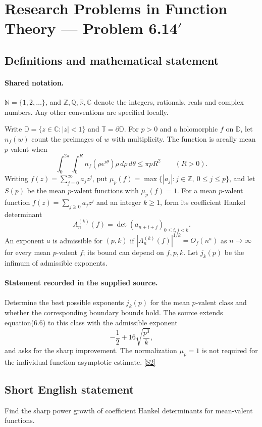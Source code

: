 \documentclass[11pt]{article}
\newcommand{\sref}[2]{\hyperlink{source:#1:#2}{[S#2]}}
\begin{document}
\section{Research Problems in Function Theory — Problem 6.14$\prime$}\label{statement}

\subsection{Definitions and mathematical statement}

\paragraph{Shared notation.}$\mathbb N=\{1,2,\ldots\}$, and $\mathbb Z,\mathbb Q,\mathbb R,\mathbb C$ denote the integers, rationals, reals and complex numbers. Any other conventions are specified locally.


Write $\mathbb D=\{z\in\mathbb C:|z|<1\}$ and $\mathbb T=\partial\mathbb D$. For $p>0$ and a holomorphic $f$ on $\mathbb D$, let $n_f(w)$ count the preimages of $w$ with multiplicity. The function is areally mean $p$-valent when
\[\int_0^{2\pi}\int_0^R n_f(\rho e^{i\theta})\rho\,d\rho\,d\theta\leq\pi pR^2\qquad(R>0).\]
Writing $f(z)=\sum_{j=0}^{\infty}a_jz^j$, put $\mu_p(f)=\max\{|a_j|:j\in\mathbb Z,\ 0\leq j\leq p\}$, and let $S(p)$ be the mean $p$-valent functions with $\mu_p(f)=1$.
For a mean $p$-valent function $f(z)=\sum_{j\geq0}a_jz^j$ and an integer $k\geq1$, form its coefficient Hankel determinant
\[A_n^{(k)}(f)=\det(a_{n+i+j})_{0\leq i,j<k}.\]
An exponent $a$ is admissible for $(p,k)$ if $|A_n^{(k)}(f)|^{1/k}=O_f(n^a)$ as $n\to\infty$ for every mean $p$-valent $f$; its bound can depend on $f,p,k$. Let $j_k(p)$ be the infimum of admissible exponents.
\paragraph{Statement recorded in the supplied source.}
Determine the best possible exponents $j_k(p)$ for the mean $p$-valent class and whether the corresponding boundary bounds hold. The source extends equation(6.6) to this class with the admissible exponent
\[-\frac12+16\sqrt{\frac{p^3}{k}},\]
and asks for the sharp improvement. The normalization $\mu_p=1$ is not required for the individual-function asymptotic estimate. \sref{statement}{2}
\subsection{Short English statement}
Find the sharp power growth of coefficient Hankel determinants for mean-valent functions.
\end{document}
